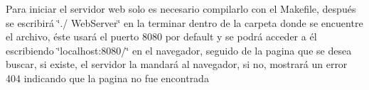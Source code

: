 Para iniciar el servidor web solo es necesario compilarlo con el Makefile, después se escribirá \char`\"{}./ Web\-Server\char`\"{} en la terminar dentro de la carpeta donde se encuentre el archivo, éste usará el puerto 8080 por default y se podrá acceder a él escribiendo \char`\"{}localhost\-:8080/\char`\"{} en el navegador, seguido de la pagina que se desea buscar, si existe, el servidor la mandará al navegador, si no, mostrará un error 404 indicando que la pagina no fue encontrada 